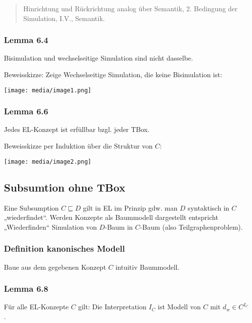\begin{quote}
Hinrichtung und Rückrichtung analog über Semantik, 2. Bedingung der
Simulation, I.V., Semantik.
\end{quote}

\subsubsection{Lemma 6.4}\label{lemma-6.4}

Bisimulation und wechselseitige Simulation sind nicht dasselbe.

Beweisskizze: Zeige Wechselseitige Simulation, die keine Bisimulation
ist:

\texttt{[image: media/image1.png]}

\subsubsection{Lemma 6.6}\label{lemma-6.6}

Jedes EL-Konzept ist erfüllbar bzgl. jeder TBox.

Beweisskizze per Induktion über die Struktur von $C$:

\texttt{[image: media/image2.png]}

\subsection{Subsumtion ohne TBox}\label{subsumtion-ohne-tbox}

Eine Subsumption $C \sqsubseteq D$ gilt in EL im Prinzip gdw. man
$D$ syntaktisch in $C$ „wiederfindet``. Werden Konzepte als
Baummodell dargestellt entspricht „Wiederfinden`` Simulation von
$D$-Baum in $C$-Baum (also Teilgraphenproblem).

\subsubsection{Definition kanonisches
Modell}\label{definition-kanonisches-modell}

Baue aus dem gegebenen Konzept $C$ intuitiv Baummodell.

\hypertarget{lemma-6.8}{\subsubsection{Lemma 6.8}\label{lemma-6.8}}

Für alle EL-Konzepte $C$ gilt: Die Interpretation $I_{C}$ ist Modell
von $C$ mit $d_{w} \in C^{I_{C}}$.

